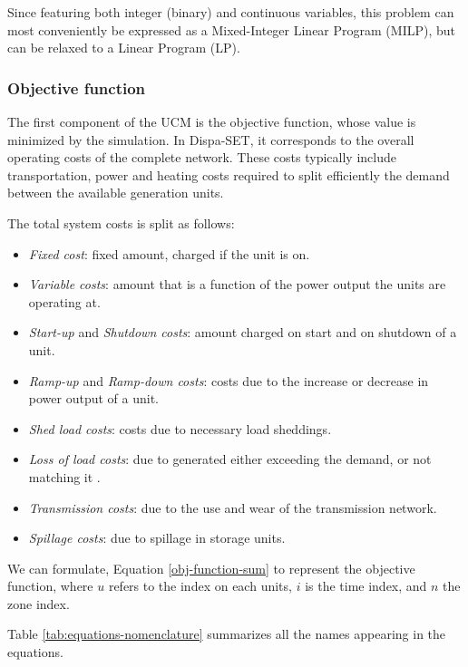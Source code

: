 Since featuring both integer (binary) and continuous variables, this problem can most conveniently be expressed as a Mixed-Integer Linear Program (MILP), but can be relaxed to a Linear Program (LP).

\subsubsection{Objective function}

The first component of the UCM is the objective function, whose value is minimized by the simulation. In Dispa-SET, it corresponds to the overall operating costs of the complete network. These costs typically include transportation, power and heating costs required to split efficiently the demand between the available generation units.

The total system costs is split as follows:
\begin{itemize}
    \item \textit{Fixed cost}: fixed amount, charged if the unit is on.
    \item \textit{Variable costs}: amount that is a function of the power output the units are operating at.
    \item \textit{Start-up} and \textit{Shutdown costs}: amount charged on start and on shutdown of a unit.
    \item \textit{Ramp-up} and \textit{Ramp-down costs}: costs due to the increase or decrease in power output of a unit.
    \item \textit{Shed load costs}: costs due to necessary load sheddings.
    \item \textit{Loss of load costs}: due to generated either exceeding the demand, or not matching it .
    \item \textit{Transmission costs}: due to the use and wear of the transmission network.
    \item \textit{Spillage costs}: due to spillage in storage units.
\end{itemize}

We can formulate, Equation \ref{obj-function-sum} to represent the objective function, where $u$ refers to the index on each units, $i$ is the time index, and $n$ the zone index.

Table \ref{tab:equations-nomenclature} summarizes all the names appearing in the equations.

